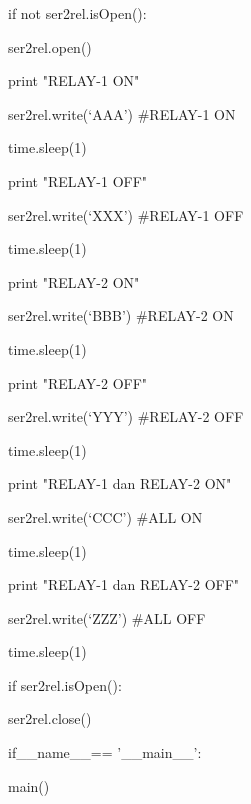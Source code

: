\begin{enumerate}
    if not ser2rel.isOpen(): 
    
        ser2rel.open() 
        
    print "RELAY-1 ON" 
    
    ser2rel.write(‘AAA’)    \#RELAY-1 ON 
    
    time.sleep(1) 
    
    print "RELAY-1 OFF" 
    
    ser2rel.write(‘XXX’)    \#RELAY-1 OFF 
    
    time.sleep(1) 
    
    print "RELAY-2 ON" 
    
    ser2rel.write(‘BBB’)    \#RELAY-2 ON 
    
    time.sleep(1) 
    
    print "RELAY-2 OFF" 
    
    ser2rel.write(‘YYY’)    \#RELAY-2 OFF 
    
    time.sleep(1) 
    
    print "RELAY-1 dan RELAY-2 ON" 
    
    ser2rel.write(‘CCC’)    \#ALL ON 
    
    time.sleep(1) 
    
    print "RELAY-1 dan RELAY-2 OFF" 
    
    ser2rel.write(‘ZZZ’)    \#ALL OFF 
    
    time.sleep(1) 
    
    if ser2rel.isOpen(): 
    
        ser2rel.close() 
        
        if\_\_name\_\_== '\_\_main\_\_':
        
        main()





\end{enumerate}
